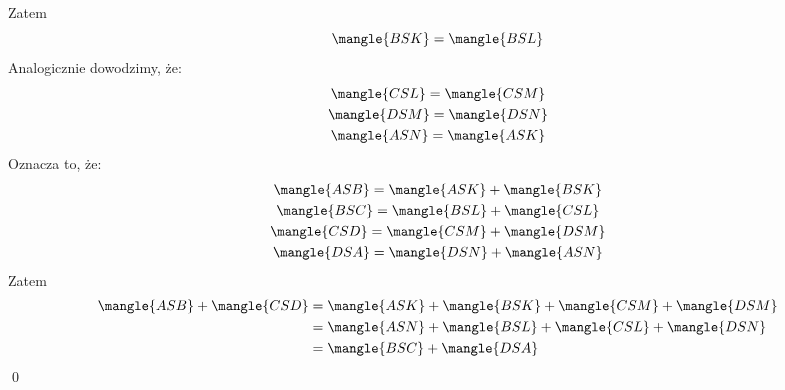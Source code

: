 Zatem
\begin{equation*}
    \mangle{BSK} = \mangle{BSL}
\end{equation*}
Analogicznie dowodzimy, że:
\begin{gather*}
    \mangle{CSL} = \mangle{CSM}\\
    \mangle{DSM} = \mangle{DSN}\\
    \mangle{ASN} = \mangle{ASK}
\end{gather*}
Oznacza to, że:
\begin{gather*}
    \mangle{ASB} = \mangle{ASK} + \mangle{BSK}\\
    \mangle{BSC} = \mangle{BSL} + \mangle{CSL}\\
    \mangle{CSD} = \mangle{CSM} + \mangle{DSM}\\
    \mangle{DSA} = \mangle{DSN} + \mangle{ASN}
\end{gather*}
Zatem
\begin{equation*}
    \begin{split}
        \mangle{ASB} + \mangle{CSD}
        &= \mangle{ASK} + \mangle{BSK} + \mangle{CSM} + \mangle{DSM}\\
        &= \mangle{ASN} + \mangle{BSL} + \mangle{CSL} + \mangle{DSN}\\
        &= \mangle{BSC} + \mangle{DSA}
    \end{split}
\end{equation*}
\qed

